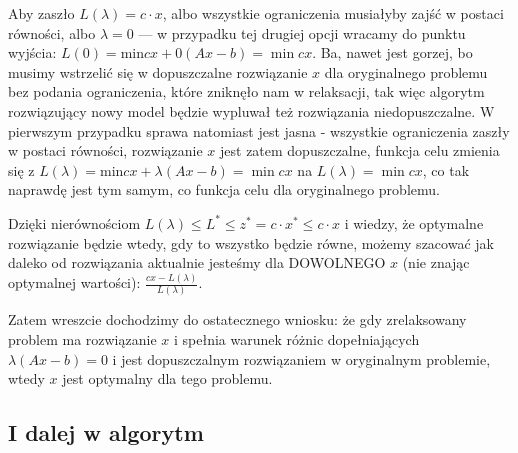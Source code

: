 Aby zaszło  $L \left( \lambda \right) = c \cdot x$, albo wszystkie ograniczenia musiałyby zajść w postaci równości, albo $\lambda = 0$ --- w przypadku tej drugiej opcji wracamy do punktu wyjścia: $L \left( 0 \right) = \text{min} cx + 0 \left( Ax - b \right) = \min cx$. Ba, nawet jest gorzej, bo musimy wstrzelić się w dopuszczalne rozwiązanie $x$ dla oryginalnego problemu bez podania ograniczenia, które zniknęło nam w relaksacji, tak więc algorytm rozwiązujący nowy model będzie wypluwał też rozwiązania niedopuszczalne. W pierwszym przypadku sprawa natomiast jest jasna - wszystkie ograniczenia zaszły w postaci równości, rozwiązanie $x$ jest zatem dopuszczalne, funkcja celu zmienia się z $L \left( \lambda \right) = \text{min} cx + \lambda \left( Ax - b \right) = \min cx$ na $L \left( \lambda \right) = \min cx$, co tak naprawdę jest tym samym, co funkcja celu dla oryginalnego problemu.

Dzięki nierównościom $L \left( \lambda \right) \leqslant L^{\ast} \leqslant z^{\ast} = c \cdot x^{\ast} \leqslant c \cdot x$ i wiedzy, że optymalne rozwiązanie będzie wtedy, gdy to wszystko będzie równe, możemy szacować jak daleko od rozwiązania aktualnie jesteśmy dla DOWOLNEGO $x$ (nie znając optymalnej wartości): $\frac{cx - L \left( \lambda \right)}{L \left( \lambda \right)}$.

Zatem wreszcie dochodzimy do ostatecznego wniosku: że gdy zrelaksowany problem ma rozwiązanie $x$ i spełnia warunek różnic dopełniających $\lambda \left( Ax - b\right) = 0$ i jest dopuszczalnym rozwiązaniem w oryginalnym problemie, wtedy $x$ jest optymalny dla tego problemu.

\subsection{I dalej w algorytm}


